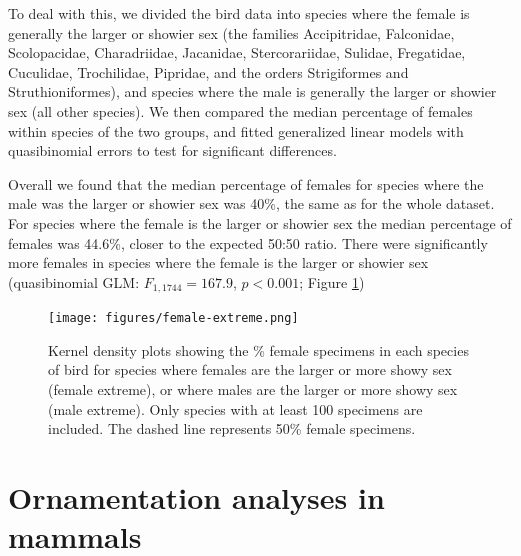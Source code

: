\documentclass[a4paper, 12pt]{article}
\begin{document}
To deal with this, we divided the bird data into species where the female is generally the larger or showier sex (the families  Accipitridae, Falconidae, Scolopacidae, Charadriidae, Jacanidae, Stercorariidae, Sulidae, Fregatidae, Cuculidae, Trochilidae, Pipridae, and the orders Strigiformes and Struthioniformes), and species where the male is generally the larger or showier sex (all other species). We then compared the median percentage of females within species of the two groups, and fitted generalized linear models with quasibinomial errors to test for significant differences. 

Overall we found that the median percentage of females for species where the male was the larger or showier sex was 40\%, the same as for the whole dataset. 
For species where the female is the larger or showier sex the median percentage of females was 44.6\%, closer to the expected 50:50 ratio. 
There were significantly more females in species where the female is the larger or showier sex (quasibinomial GLM: $F_{1,1744} = 167.9$, $p < 0.001$; Figure \ref{fig-reverse})

\begin{figure}[H]
 \centering
  \texttt{[image: figures/female-extreme.png]}
  \caption{Kernel density plots showing the \% female specimens in each species of bird for species where females are the larger or more showy sex (female extreme), or where males are the larger or more showy sex (male extreme). 
  Only species with at least 100 specimens are included. 
  The dashed line represents 50\% female specimens. }
  \label{fig-reverse}
\end{figure}

\newpage
\section{Ornamentation analyses in mammals}
\end{document}
